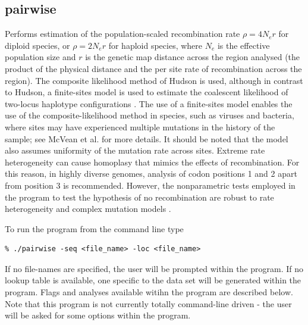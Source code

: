 \documentclass[a4paper,10pt,fullpage]{article}
\begin{document}
\subsection{pairwise}
Performs estimation of the population-scaled recombination rate
$\rho=4N_er$ for diploid species, or $\rho=2N_er$ for haploid
species, where $N_e$ is the effective population size and $r$ is
the genetic map distance across the region analysed (the product
of the physical distance and the per site rate of recombination
across the region).  The composite likelihood method of Hudson
\cite{Hudson01} is used, although in contrast to Hudson, a
finite-sites model is used to estimate the coalescent likelihood
of two-locus haplotype configurations \cite{McVeanetal02}.  The
use of a finite-sites model enables the use of the
composite-likelihood method in species, such as viruses and
bacteria, where sites may have experienced multiple mutations in
the history of the sample; see McVean et al. \cite{McVeanetal02}
for more details.  It should be noted that the model also assumes
uniformity of the mutation rate across sites. Extreme rate
heterogeneity can cause homoplasy that mimics the effects of
recombination.  For this reason, in highly diverse genomes,
analysis of codon positions 1 and 2 apart from position 3 is
recommended.  However, the nonparametric tests employed in the
program to test the hypothesis of no recombination are robust to
rate heterogeneity and complex mutation models
\cite{McVeanetal02}.

To run the program from the command line type

\begin{verbatim}
% ./pairwise -seq <file_name> -loc <file_name>
\end{verbatim}
If no file-names are specified, the user will be prompted within
the program.  If no lookup table is available, one specific to the
data set will be generated within the program. Flags and analyses available witihn the program are described below.  Note that this program is not currently totally command-line driven - the user will be asked for some options within the program.
\end{document}
